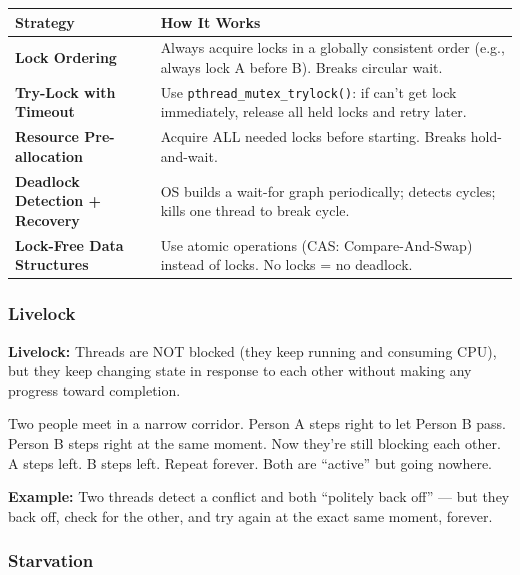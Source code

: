 \documentclass[11pt,a4paper]{article}
\newcommand{\code}[1]{\texttt{\small\colorbox{codebg}{\color{codekw}#1}}}
\newcommand{\term}[1]{\textbf{\color{darkblue}#1}}
\begin{document}
\begin{center}
\begin{tabular}{L{4.5cm} L{9cm}}
\toprule
\textbf{Strategy} & \textbf{How It Works} \\
\midrule
\term{Lock Ordering} & Always acquire locks in a globally consistent order (e.g., always lock A before B). Breaks circular wait. \\[4pt]
\term{Try-Lock with Timeout} & Use \code{pthread\_mutex\_trylock()}: if can't get lock immediately, release all held locks and retry later. \\[4pt]
\term{Resource Pre-allocation} & Acquire ALL needed locks before starting. Breaks hold-and-wait. \\[4pt]
\term{Deadlock Detection + Recovery} & OS builds a wait-for graph periodically; detects cycles; kills one thread to break cycle. \\[4pt]
\term{Lock-Free Data Structures} & Use atomic operations (CAS: Compare-And-Swap) instead of locks. No locks = no deadlock. \\
\bottomrule
\end{tabular}
\end{center}

\subsubsection{Livelock}

\begin{mydef}
\textbf{Livelock:} Threads are NOT blocked (they keep running and consuming CPU), but they keep changing state in response to each other without making any progress toward completion.
\end{mydef}

\begin{analogy}
Two people meet in a narrow corridor. Person A steps right to let Person B pass. Person B steps right at the same moment. Now they're still blocking each other. A steps left. B steps left. Repeat forever. Both are ``active'' but going nowhere.
\end{analogy}

\textbf{Example:} Two threads detect a conflict and both ``politely back off'' --- but they back off, check for the other, and try again at the exact same moment, forever.

\subsubsection{Starvation}
\end{document}
